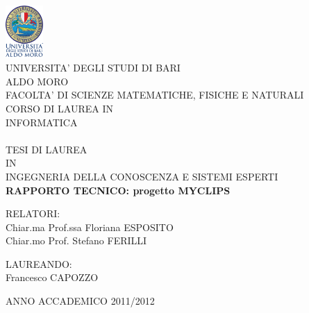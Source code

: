 
\begin{center}
\includegraphics[height=2cm]{Immagini/logo.png}\\
\LARGE{UNIVERSITA' DEGLI STUDI DI BARI}\\
\LARGE{ALDO MORO}\\
\vspace{0.5cm}
\small{FACOLTA' DI SCIENZE MATEMATICHE, FISICHE E NATURALI}\\
CORSO DI LAUREA IN\\
INFORMATICA\\
\hrulefill \\ %
\vspace{0.2cm}
TESI DI LAUREA\\
\vspace{0.2cm}
IN\\
\vspace{0.2cm}
\normalsize{INGEGNERIA DELLA CONOSCENZA E SISTEMI ESPERTI}\\
\vspace{2cm}%
\large{\textbf{RAPPORTO TECNICO: progetto MYCLIPS}}\\
\thispagestyle{empty}%
\end{center}
\vspace{3cm}
RELATORI:\\
Chiar.ma Prof.ssa Floriana ESPOSITO\\
Chiar.mo Prof. Stefano FERILLI

\begin{flushright}
LAUREANDO:\\
Francesco CAPOZZO\\
\end{flushright}
\hrulefill
\begin{center}
\small{ANNO ACCADEMICO 2011/2012}
\end{center}